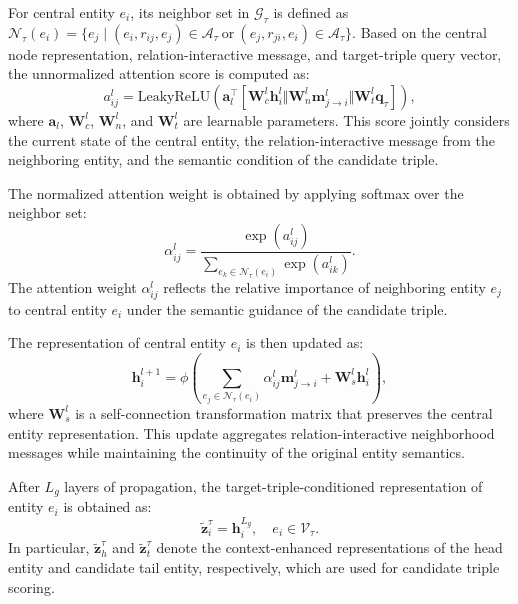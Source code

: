 \documentclass[a4paper,fleqn]{cas-sc}
\begin{document}
For central entity $e_i$, its neighbor set in $\mathcal{G}_{\tau}$ is defined as
$\mathcal{N}_{\tau}(e_i)=\{e_j\mid(e_i,r_{ij},e_j)\in\mathcal{A}_{\tau}\ \mathrm{or}\ (e_j,r_{ji},e_i)\in\mathcal{A}_{\tau}\}$.
Based on the central node representation, relation-interactive message, and target-triple query vector, the unnormalized attention score is computed as:
\begin{equation}
a_{ij}^{l}
=
\mathrm{LeakyReLU}
\left(
\mathbf{a}_{l}^{\top}
\left[
\mathbf{W}_{c}^{l}\mathbf{h}_{i}^{l}
\Vert
\mathbf{W}_{n}^{l}\mathbf{m}_{j\rightarrow i}^{l}
\Vert
\mathbf{W}_{t}^{l}\mathbf{q}_{\tau}
\right]
\right),
\end{equation}
where $\mathbf{a}_{l}$, $\mathbf{W}_{c}^{l}$, $\mathbf{W}_{n}^{l}$, and $\mathbf{W}_{t}^{l}$ are learnable parameters. This score jointly considers the current state of the central entity, the relation-interactive message from the neighboring entity, and the semantic condition of the candidate triple.

The normalized attention weight is obtained by applying softmax over the neighbor set:
\begin{equation}
\alpha_{ij}^{l}
=
\frac{
\exp(a_{ij}^{l})
}{
\sum_{e_k\in\mathcal{N}_{\tau}(e_i)}
\exp(a_{ik}^{l})
}.
\end{equation}
The attention weight $\alpha_{ij}^{l}$ reflects the relative importance of neighboring entity $e_j$ to central entity $e_i$ under the semantic guidance of the candidate triple.

The representation of central entity $e_i$ is then updated as:
\begin{equation}
\mathbf{h}_{i}^{l+1}
=
\phi
\left(
\sum_{e_j\in\mathcal{N}_{\tau}(e_i)}
\alpha_{ij}^{l}
\mathbf{m}_{j\rightarrow i}^{l}
+
\mathbf{W}_{s}^{l}\mathbf{h}_{i}^{l}
\right),
\end{equation}
where $\mathbf{W}_{s}^{l}$ is a self-connection transformation matrix that preserves the central entity representation. This update aggregates relation-interactive neighborhood messages while maintaining the continuity of the original entity semantics.

After $L_g$ layers of propagation, the target-triple-conditioned representation of entity $e_i$ is obtained as:
\begin{equation}
\widetilde{\mathbf{z}}_{i}^{\tau}
=
\mathbf{h}_{i}^{L_g},
\quad e_i\in\mathcal{V}_{\tau}.
\end{equation}
In particular, $\widetilde{\mathbf{z}}_{h}^{\tau}$ and $\widetilde{\mathbf{z}}_{t}^{\tau}$ denote the context-enhanced representations of the head entity and candidate tail entity, respectively, which are used for candidate triple scoring.
\end{document}

